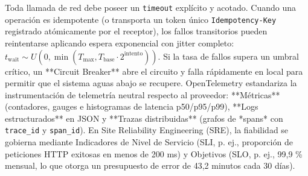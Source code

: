 \documentclass{book}
\begin{document}
Toda llamada de red debe poseer un \texttt{timeout} explícito y acotado. Cuando una operación es idempotente (o transporta un token único \texttt{Idempotency-Key} registrado atómicamente por el receptor), los fallos transitorios pueden reintentarse aplicando espera exponencial con jitter completo: \(t_{\text{wait}} \sim U(0, \min(T_{\max}, T_{\text{base}} \cdot 2^{\text{intento}}))\). Si la tasa de fallos supera un umbral crítico, un **Circuit Breaker** abre el circuito y falla rápidamente en local para permitir que el sistema aguas abajo se recupere.
OpenTelemetry estandariza la instrumentación de telemetría neutral respecto al proveedor: **Métricas** (contadores, gauges e histogramas de latencia p50/p95/p99), **Logs estructurados** en JSON y **Trazas distribuidas** (grafos de *spans* con \texttt{trace\_id} y \texttt{span\_id}). En Site Reliability Engineering (SRE), la fiabilidad se gobierna mediante Indicadores de Nivel de Servicio (SLI, p. ej., proporción de peticiones HTTP exitosas en menos de 200 ms) y Objetivos (SLO, p. ej., 99,9 \% mensual, lo que otorga un presupuesto de error de 43,2 minutos cada 30 días).
\end{document}

